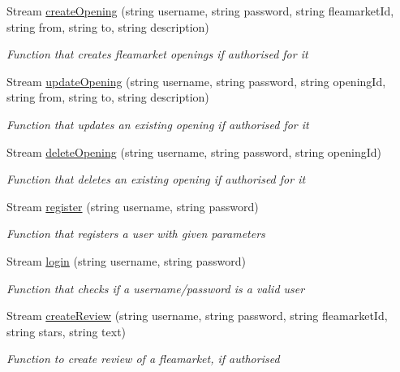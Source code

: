 \begin{DoxyCompactItemize}
Stream \hyperlink{interface_service_library_1_1_i_rest_service_a8da12dfeb7d26f50c935c17ed4969ef8}{create\-Opening} (string username, string password, string fleamarket\-Id, string from, string to, string description)
\begin{DoxyCompactList}\small\item\em Function that creates fleamarket openings if authorised for it \end{DoxyCompactList}\item 
Stream \hyperlink{interface_service_library_1_1_i_rest_service_aff55a9fbcda58a0830319982233420b8}{update\-Opening} (string username, string password, string opening\-Id, string from, string to, string description)
\begin{DoxyCompactList}\small\item\em Function that updates an existing opening if authorised for it \end{DoxyCompactList}\item 
Stream \hyperlink{interface_service_library_1_1_i_rest_service_a4bfa508142405715bb37792073c43eb2}{delete\-Opening} (string username, string password, string opening\-Id)
\begin{DoxyCompactList}\small\item\em Function that deletes an existing opening if authorised for it \end{DoxyCompactList}\item 
Stream \hyperlink{interface_service_library_1_1_i_rest_service_ae566a85d019d87c013ed069b381e59ee}{register} (string username, string password)
\begin{DoxyCompactList}\small\item\em Function that registers a user with given parameters \end{DoxyCompactList}\item 
Stream \hyperlink{interface_service_library_1_1_i_rest_service_aa0ee715b0c69f4c024ede0d91939c4a2}{login} (string username, string password)
\begin{DoxyCompactList}\small\item\em Function that checks if a username/password is a valid user \end{DoxyCompactList}\item 
Stream \hyperlink{interface_service_library_1_1_i_rest_service_a925656ba45a706648af391a00733e45f}{create\-Review} (string username, string password, string fleamarket\-Id, string stars, string text)
\begin{DoxyCompactList}\small\item\em Function to create review of a fleamarket, if authorised \end{DoxyCompactList}\item 

\end{DoxyCompactItemize}
